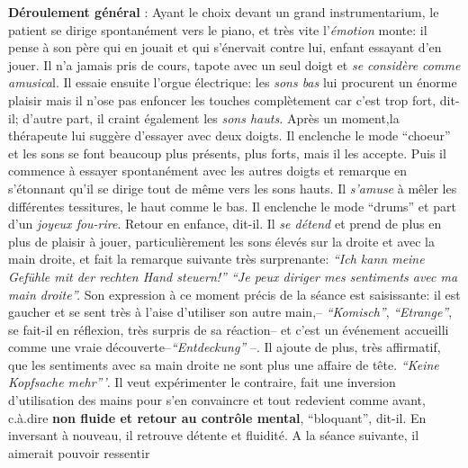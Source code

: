      	 \textbf{Déroulement général} :
    Ayant le choix devant un grand instrumentarium,
            le patient se dirige spontanément vers le piano, et très vite
            l'\textit{émotion} monte: il pense à son père qui en jouait et qui
            s'énervait contre lui, enfant essayant d'en
            jouer. Il n'a jamais pris de cours, tapote avec un seul doigt et \textit{se considère comme
            amusica}l. Il essaie ensuite l'orgue électrique: les \textit{sons bas}
            lui procurent un énorme plaisir mais il n'ose pas enfoncer les touches
            complètement car c'est trop fort, dit-il; d'autre part, il
            craint également les
            \textit{sons hauts.}
            Après un moment,la thérapeute lui suggère d'essayer avec deux doigts.
            Il enclenche le mode ``choeur'' et les sons se font beaucoup
            plus présents, plus forts, mais il les accepte. Puis il commence à essayer spontanément
            avec les autres doigts et remarque en s'étonnant qu'il se
            dirige tout de même vers les sons
            hauts. Il \textit{s'amuse} à mêler les différentes tessitures,
            le haut comme le bas.
            Il enclenche le mode ``drums'' et part d'un\textit{ joyeux
            fou-rire}. Retour en enfance, dit-il.
            Il \textit{se détend} et prend de plus en plus de plaisir à jouer, particulièrement  les sons élevés
            sur la droite et avec la main droite, et fait
            la remarque suivante très surprenante:
            \textit{``Ich kann meine Gefühle mit der rechten Hand steuern!''
            ``Je peux diriger mes sentiments avec ma main droite''.}
     Son expression à ce moment précis de la séance est saisissante: il
            est gaucher et se sent très à l'aise d'utiliser son autre
            main,-- \textit{``Komisch''},  \textit{``Etrange''}, se fait-il
            en réflexion, très surpris de sa réaction-- et c'est un événement
            accueilli comme une vraie
            découverte--\textit{``Entdeckung''} --.
            Il ajoute de plus, très affirmatif, que les sentiments avec sa main
            droite ne sont plus une affaire de tête. \textit{``Keine
            Kopfsache mehr'''}. Il veut expérimenter le contraire, fait
          une inversion d'utilisation des mains pour s'en convaincre et tout redevient comme
            avant, c.à.dire \textbf{non fluide et retour au contrôle
              mental},
            ``bloquant'', dit-il. En inversant à nouveau, il retrouve
            détente et fluidité.
            A la séance suivante, il aimerait pouvoir ressentir
